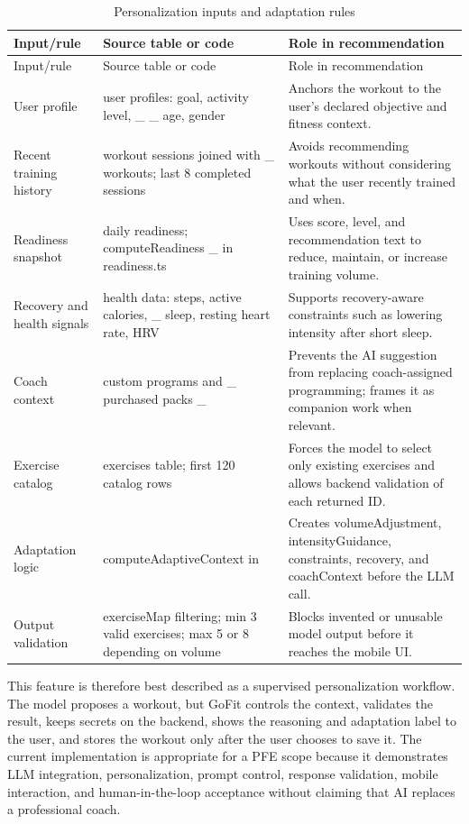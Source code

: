 \documentclass[12pt,a4paper,openany]{report}
\begin{document}
\begingroup
\footnotesize
\setlength{\tabcolsep}{3pt}
\renewcommand{\arraystretch}{1.20}
\setlength{\LTpre}{5pt}
\setlength{\LTpost}{10pt}
\begin{longtable}{|L{3.67cm}|L{5.29cm}|L{5.73cm}|}
\caption{Personalization inputs and adaptation rules}\label{tab:pdf-82-39} \\
\hline
{}
Input/rule & Source table or code & Role in recommendation \\ \hline
\endfirsthead
\hline
{}
Input/rule & Source table or code & Role in recommendation \\ \hline
\endhead
User profile & user profiles: goal, activity level, \_ \_ age, gender & Anchors the workout to the user's declared objective and fitness context. \\ \hline
Recent training history & workout sessions joined with \_ workouts; last 8 completed sessions & Avoids recommending workouts without considering what the user recently trained and when. \\ \hline
Readiness snapshot & daily readiness; computeReadiness \_ in readiness.ts & Uses score, level, and recommendation text to reduce, maintain, or increase training volume. \\ \hline
Recovery and health signals & health data: steps, active calories, \_ sleep, resting heart rate, HRV & Supports recovery-aware constraints such as lowering intensity after short sleep. \\ \hline
Coach context & custom programs and \_ purchased packs \_ & Prevents the AI suggestion from replacing coach-assigned programming; frames it as companion work when relevant. \\ \hline
Exercise catalog & exercises table; first 120 catalog rows & Forces the model to select only existing exercises and allows backend validation of each returned ID. \\ \hline
Adaptation logic & computeAdaptiveContext in  & Creates volumeAdjustment, intensityGuidance, constraints, recovery, and coachContext before the LLM call. \\ \hline
Output validation & exerciseMap filtering; min 3 valid exercises; max 5 or 8 depending on volume & Blocks invented or unusable model output before it reaches the mobile UI. \\ \hline
\end{longtable}
\endgroup

This feature is therefore best described as a supervised personalization workflow. The model proposes a workout, but GoFit controls the context, validates the result, keeps secrets on the backend, shows the reasoning and adaptation label to the user, and stores the workout only after the user chooses to save it. The current implementation is appropriate for a PFE scope because it demonstrates LLM integration, personalization, prompt control, response validation, mobile interaction, and human-in-the-loop acceptance without claiming that AI replaces a professional coach.
\end{document}
